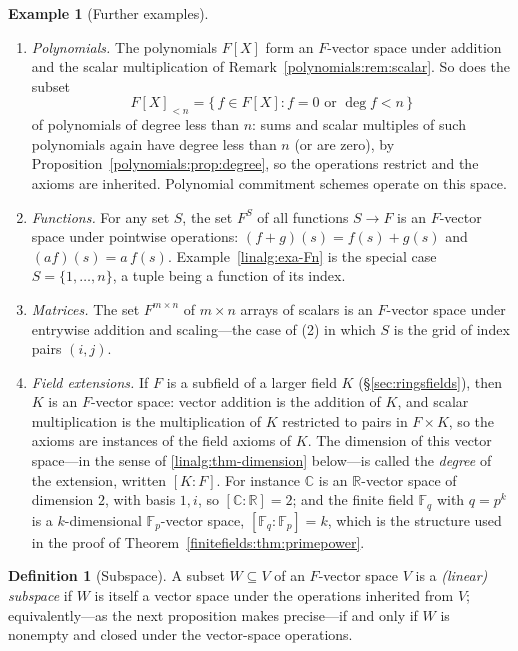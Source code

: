 \documentclass[11pt,a4paper]{article}
\theoremstyle{definition}
\newtheorem{definition}[theorem]{Definition}
\newtheorem{example}[theorem]{Example}
\theoremstyle{remark}
\newcommand{\R}{\ensuremath{\mathbb{R}}}
\providecommand{\C}{}\renewcommand{\C}{\ensuremath{\mathbb{C}}}
\newcommand{\Fp}{\ensuremath{\mathbb{F}_{p}}}
\newcommand{\Fq}{\ensuremath{\mathbb{F}_{q}}}
\begin{document}
\begin{example}[Further examples]\label{linalg:exa-more}
\begin{enumerate}
\item \emph{Polynomials.} The polynomials \(F[X]\) form an
  \(F\)-vector space under addition and the scalar multiplication of
  Remark~\ref{polynomials:rem:scalar}. So does the subset
  \[
  F[X]_{<n} = \{\, f \in F[X] : f = 0 \text{ or } \deg f < n \,\}
  \]
  of polynomials of degree less than \(n\): sums and scalar multiples of
  such polynomials again have degree less than \(n\) (or are zero), by
  Proposition~\ref{polynomials:prop:degree}, so the operations restrict
  and the axioms are inherited. Polynomial commitment schemes operate on
  this space.
\item \emph{Functions.} For any set \(S\), the set \(F^S\) of all
  functions \(S \to F\) is an \(F\)-vector space under pointwise
  operations: \((f + g)(s) = f(s) + g(s)\) and \((af)(s) = a\,f(s)\).
  Example~\ref{linalg:exa-Fn} is the special case \(S = \{1, \dots, n\}\),
  a tuple being a function of its index.
\item \emph{Matrices.} The set \(F^{m \times n}\) of \(m \times n\)
  arrays of scalars is an \(F\)-vector space under entrywise addition
  and scaling---the case of (2) in which \(S\) is the grid of index
  pairs \((i, j)\).
\item \emph{Field extensions.} If \(F\) is a subfield of a larger field
  \(K\) (\S\ref{sec:ringsfields}), then \(K\) is an \(F\)-vector space:
  vector addition is the addition of \(K\), and scalar multiplication is
  the multiplication of \(K\) restricted to pairs in \(F \times K\), so
  the axioms are instances of the field axioms of \(K\). The dimension
  of this vector space---in the sense of \cref{linalg:thm-dimension}
  below---is called the \emph{degree} of the extension, written
  \([K:F]\). For instance \(\C\) is an \(\R\)-vector space of
  dimension \(2\), with basis \(1, i\), so \([\C:\R] = 2\); and the
  finite field \(\Fq\) with \(q = p^k\) is a \(k\)-dimensional
  \(\Fp\)-vector space, \([\Fq:\Fp] = k\), which is the structure used in
  the proof of Theorem~\ref{finitefields:thm:primepower}.
\end{enumerate}
\end{example}

\begin{definition}[Subspace]\label{linalg:def-subspace}
A subset \(W \subseteq V\) of an \(F\)-vector space \(V\) is a
\emph{(linear) subspace} if \(W\) is itself a vector space under the
operations inherited from \(V\); equivalently---as the next proposition
makes precise---if and only if \(W\) is nonempty and closed under the
vector-space operations.
\end{definition}
\end{document}
